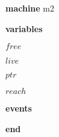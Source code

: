 \begin{block}
  \item   \textbf{machine} m2
  \item   \textbf{variables}
  \begin{block}
    \item   $free$
    \item   $live$
    \item   $ptr$
    \item   $reach$
  \end{block}
  \item   
  \item   
  \item   
  \item   \textbf{events}
  \begin{block}
    \item   
    \item   
    \item   
    \item   
  \end{block}
  \item   \textbf{end} \\
\end{block}

